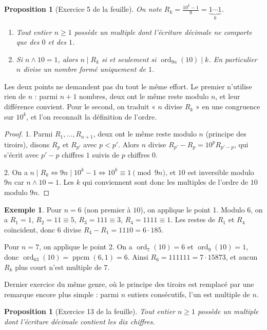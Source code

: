 \documentclass[11pt,a4paper]{article}
\theoremstyle{plain}
\newtheorem{proposition}[theoreme]{Proposition}
\theoremstyle{definition}
\newtheorem{exemple}[theoreme]{Exemple}
\theoremstyle{remark}
\newcommand{\pgcd}{\wedge}
\DeclareMathOperator{\ord}{ord}
\begin{document}
\begin{proposition}[Exercice 5 de la feuille]\label{prop:repunit}
On note $R_k=\frac{10^k-1}{9}=\underbrace{1\cdots1}_{k}$.
\begin{enumerate}[nosep]
\item Tout entier $n\geq1$ possède un multiple dont l'écriture décimale ne comporte que des $0$ et des $1$.
\item Si $n\pgcd 10=1$, alors $n\mid R_k$ si et seulement si $\ord_{9n}(10)\mid k$. En particulier $n$ divise un nombre formé uniquement de $1$.
\end{enumerate}
\end{proposition}

Les deux points ne demandent pas du tout le même effort. Le premier n'utilise rien de $n$ : parmi $n+1$ nombres, deux ont le même reste modulo $n$, et leur différence convient. Pour le second, on traduit « $n$ divise $R_k$ » en une congruence sur $10^k$, et l'on reconnaît la définition de l'ordre.

\begin{proof}
1. Parmi $R_1,\dots,R_{n+1}$, deux ont le même reste modulo $n$ (principe des tiroirs), disons $R_p$ et $R_{p'}$ avec $p<p'$. Alors $n$ divise $R_{p'}-R_p=10^p R_{p'-p}$, qui s'écrit avec $p'-p$ chiffres $1$ suivis de $p$ chiffres $0$.

2. On a $n\mid R_k\iff 9n\mid 10^k-1\iff 10^k\equiv1\pmod{9n}$, et $10$ est inversible modulo $9n$ car $n\pgcd10=1$. Les $k$ qui conviennent sont donc les multiples de l'ordre de $10$ modulo $9n$.
\end{proof}

\begin{exemple}
Pour $n=6$ (non premier à $10$), on applique le point 1. Modulo $6$, on a $R_1=1$, $R_2=11\equiv5$, $R_3=111\equiv3$, $R_4=1111\equiv1$. Les restes de $R_1$ et $R_4$ coïncident, donc $6$ divise $R_4-R_1=1110=6\cdot185$.

Pour $n=7$, on applique le point 2. On a $\ord_7(10)=6$ et $\ord_9(10)=1$, donc $\ord_{63}(10)=\operatorname{ppcm}(6,1)=6$. Ainsi $R_6=111111=7\cdot15873$, et aucun $R_k$ plus court n'est multiple de $7$.
\end{exemple}

Dernier exercice du même genre, où le principe des tiroirs est remplacé par une remarque encore plus simple : parmi $n$ entiers consécutifs, l'un est multiple de $n$.

\begin{proposition}[Exercice 13 de la feuille]
Tout entier $n\geq1$ possède un multiple dont l'écriture décimale contient les dix chiffres.
\end{proposition}
\end{document}
